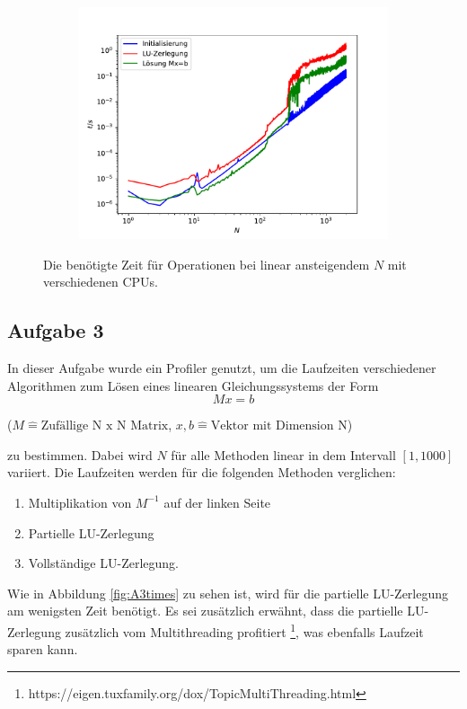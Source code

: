 \documentclass{scrartcl}
\begin{document}
\begin{figure}[h!]
\begin{subfigure}{0.4\textwidth}
		\includegraphics[width=\textwidth]{A2/Dann_halt_so/timers_lin_Prd.pdf}
		\end{subfigure}
		\caption{Die benötigte Zeit für Operationen bei linear ansteigendem $N$ mit verschiedenen CPUs.}
		\label{fig:time_lin}
        \end{figure}
        
        \FloatBarrier
        \subsection*{Aufgabe 3}
        In dieser Aufgabe wurde ein Profiler genutzt, um die Laufzeiten verschiedener Algorithmen zum Lösen eines linearen Gleichungssystems der Form 
        \begin{equation}
            Mx=b
        \end{equation}
        \begin{center}
            \tiny{($M \hat{=} \text{Zufällige N x N Matrix}$, $x, b \hat{=} \text{Vektor mit Dimension N}$)}
        \end{center}
        zu bestimmen. Dabei wird $N$ für alle Methoden linear in dem Intervall $[1, 1000]$ variiert. 
        Die Laufzeiten werden für die folgenden Methoden verglichen: 
        \begin{enumerate}
            \item Multiplikation von $M^{-1}$ auf der linken Seite \label{M1}
            \item Partielle LU-Zerlegung
            \item Vollständige LU-Zerlegung.
        \end{enumerate} 
        Wie in Abbildung \ref{fig:A3times} zu sehen ist, wird für die partielle LU-Zerlegung am wenigsten Zeit benötigt. Es sei zusätzlich erwähnt, dass die partielle LU-Zerlegung zusätzlich vom Multithreading profitiert \footnote[1]{https://eigen.tuxfamily.org/dox/TopicMultiThreading.html}, was ebenfalls Laufzeit sparen kann.
\end{document}
